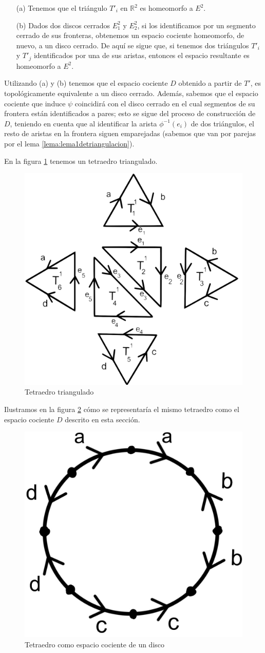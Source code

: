 \documentclass[a4paper,11pt,spanish, twoside, leqno]{tfg-uam}
\newcommand*{\reales}{\mathbb{R}}
\theoremstyle{definition}
\begin{document}
\begin{enumerate}
\item[(a)] Tenemos que el triángulo $T'_i$ en $\reales^2$ es homeomorfo a $E^2$.

\item[(b)] Dados dos discos cerrados $E^2_1$ y $E^2_2$, si los identificamos por un segmento cerrado de sus fronteras, obtenemos un espacio cociente homeomorfo, de nuevo, a un disco cerrado. De aquí se sigue que, si tenemos dos triángulos $T'_i$ y $T'_j$  identificados por una de sus aristas, entonces el espacio resultante es homeomorfo a $E^2$.
\end{enumerate}
Utilizando (a) y (b) tenemos que el espacio cociente $D$ obtenido a partir de $T'$, es topológicamente equivalente a un disco cerrado. Además, sabemos que el espacio cociente que induce $\psi$ coincidirá  con el disco cerrado en el cual segmentos de su frontera están identificados a pares; esto se sigue del proceso de construcción de $D$, teniendo en cuenta que al identificar la arista $\phi^{-1}(e_i)$ de dos triángulos, el resto de aristas en la frontera siguen emparejadas (sabemos que van por parejas por el lema \ref{lema:lema1detriangulacion}).


En la figura \ref{fig:tetraedrotriangulado} tenemos un tetraedro triangulado.

\begin{figure}[h!]
	\centering
	\includegraphics[width=0.3\linewidth]{imagenes/tetraedro.png}
	\caption{Tetraedro triangulado}
	\label{fig:tetraedrotriangulado}
\end{figure}

Ilustramos en la figura \ref{fig:d} cómo se representaría el mismo tetraedro como el espacio cociente $D$ descrito en esta sección.

\begin{figure}[h!]
	\centering
	\includegraphics[width=0.3\linewidth]{imagenes/d.jpeg}
	\caption{Tetraedro como espacio cociente de un disco}
	\label{fig:d}
\end{figure}
\end{document}

